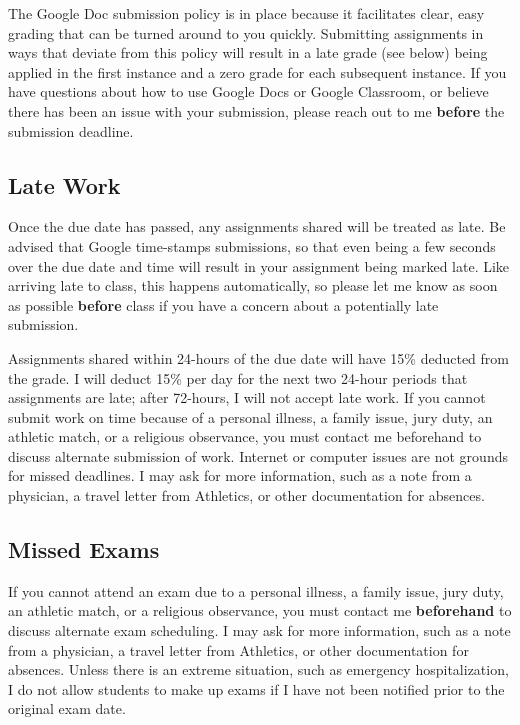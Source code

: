 \documentclass[]{book}
\begin{document}
The Google Doc submission policy is in place because it facilitates clear, easy grading that can be turned around to you quickly. Submitting assignments in ways that deviate from this policy will result in a late grade (see below) being applied in the first instance and a zero grade for each subsequent instance. If you have questions about how to use Google Docs or Google Classroom, or believe there has been an issue with your submission, please reach out to me \textbf{before} the submission deadline.

\hypertarget{late-work}{%
\subsection{Late Work}\label{late-work}}

Once the due date has passed, any assignments shared will be treated as late. Be advised that Google time-stamps submissions, so that even being a few seconds over the due date and time will result in your assignment being marked late. Like arriving late to class, this happens automatically, so please let me know as soon as possible \textbf{before} class if you have a concern about a potentially late submission.

Assignments shared within 24-hours of the due date will have 15\% deducted from the grade. I will deduct 15\% per day for the next two 24-hour periods that assignments are late; after 72-hours, I will not accept late work. If you cannot submit work on time because of a personal illness, a family issue, jury duty, an athletic match, or a religious observance, you must contact me beforehand to discuss alternate submission of work. Internet or computer issues are not grounds for missed deadlines. I may ask for more information, such as a note from a physician, a travel letter from Athletics, or other documentation for absences.

\hypertarget{missed-exams}{%
\subsection{Missed Exams}\label{missed-exams}}

If you cannot attend an exam due to a personal illness, a family issue, jury duty, an athletic match, or a religious observance, you must contact me \textbf{beforehand} to discuss alternate exam scheduling. I may ask for more information, such as a note from a physician, a travel letter from Athletics, or other documentation for absences. Unless there is an extreme situation, such as emergency hospitalization, I do not allow students to make up exams if I have not been notified prior to the original exam date.
\end{document}

